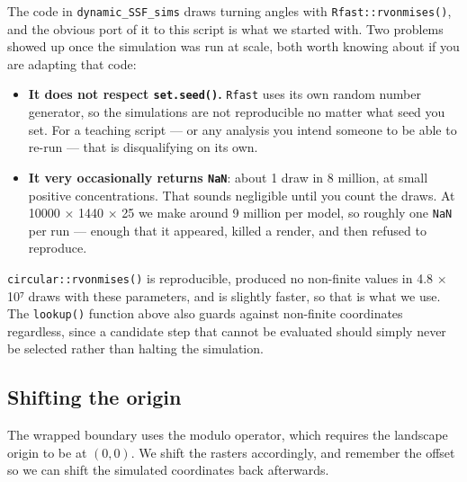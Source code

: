 \documentclass[
  letterpaper,
  DIV=11,
  numbers=noendperiod]{scrartcl}
\providecommand{\tightlist}{%
  \setlength{\itemsep}{0pt}\setlength{\parskip}{0pt}}
\begin{document}
\begin{tcolorbox}[enhanced jigsaw, arc=.35mm, bottomrule=.15mm, bottomtitle=1mm, breakable, colback=white, colbacktitle=quarto-callout-warning-color!10!white, colframe=quarto-callout-warning-color-frame, coltitle=black, left=2mm, leftrule=.75mm, opacityback=0, opacitybacktitle=0.6, rightrule=.15mm, title=\textcolor{quarto-callout-warning-color}{\faExclamationTriangle}\hspace{0.5em}{A note on \texttt{Rfast::rvonmises}}, titlerule=0mm, toprule=.15mm, toptitle=1mm]

The code in \texttt{dynamic\_SSF\_sims} draws turning angles with
\texttt{Rfast::rvonmises()}, and the obvious port of it to this script
is what we started with. Two problems showed up once the simulation was
run at scale, both worth knowing about if you are adapting that code:

\begin{itemize}
\tightlist
\item
  \textbf{It does not respect \texttt{set.seed()}.} \texttt{Rfast} uses
  its own random number generator, so the simulations are not
  reproducible no matter what seed you set. For a teaching script --- or
  any analysis you intend someone to be able to re-run --- that is
  disqualifying on its own.
\item
  \textbf{It very occasionally returns \texttt{NaN}}: about 1 draw in 8
  million, at small positive concentrations. That sounds negligible
  until you count the draws. At 10000 × 1440 × 25 we make around 9
  million per model, so roughly one \texttt{NaN} per run --- enough that
  it appeared, killed a render, and then refused to reproduce.
\end{itemize}

\texttt{circular::rvonmises()} is reproducible, produced no non-finite
values in 4.8 × 10⁷ draws with these parameters, and is slightly faster,
so that is what we use. The \texttt{lookup()} function above also guards
against non-finite coordinates regardless, since a candidate step that
cannot be evaluated should simply never be selected rather than halting
the simulation.

\end{tcolorbox}

\subsection{Shifting the origin}\label{shifting-the-origin}

The wrapped boundary uses the modulo operator, which requires the
landscape origin to be at \((0,0)\). We shift the rasters accordingly,
and remember the offset so we can shift the simulated coordinates back
afterwards.
\end{document}
